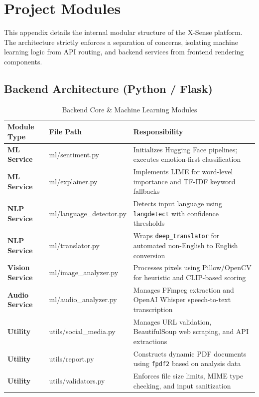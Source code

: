 \documentclass[12pt, a4paper]{report}
\begin{document}
\chapter{Project Modules}
\label{app:modules}

This appendix details the internal modular structure of the X-Sense platform. The architecture strictly enforces a separation of concerns, isolating machine learning logic from API routing, and backend services from frontend rendering components.

\section*{Backend Architecture (Python / Flask)}

\begin{table}[H]
\centering
\caption{Backend Core \& Machine Learning Modules}
\label{tab:modules-backend}
\small
\begin{tabularx}{\textwidth}{|l|l|X|}
\hline
\textbf{Module Type} & \textbf{File Path} & \textbf{Responsibility} \\
\hline
\textbf{ML Service} & ml/sentiment.py & Initializes Hugging Face pipelines; executes emotion-first classification \\
\hline
\textbf{ML Service} & ml/explainer.py & Implements LIME for word-level importance and TF-IDF keyword fallbacks \\
\hline
\textbf{NLP Service} & ml/language\_detector.py & Detects input language using \texttt{langdetect} with confidence thresholds \\
\hline
\textbf{NLP Service} & ml/translator.py & Wraps \texttt{deep\_translator} for automated non-English to English conversion \\
\hline
\textbf{Vision Service} & ml/image\_analyzer.py & Processes pixels using Pillow/OpenCV for heuristic and CLIP-based scoring \\
\hline
\textbf{Audio Service} & ml/audio\_analyzer.py & Manages FFmpeg extraction and OpenAI Whisper speech-to-text transcription \\
\hline
\textbf{Utility} & utils/social\_media.py & Manages URL validation, BeautifulSoup web scraping, and API extractions \\
\hline
\textbf{Utility} & utils/report.py & Constructs dynamic PDF documents using \texttt{fpdf2} based on analysis data \\
\hline
\textbf{Utility} & utils/validators.py & Enforces file size limits, MIME type checking, and input sanitization \\

\end{tabularx}
\end{table}
\end{document}
